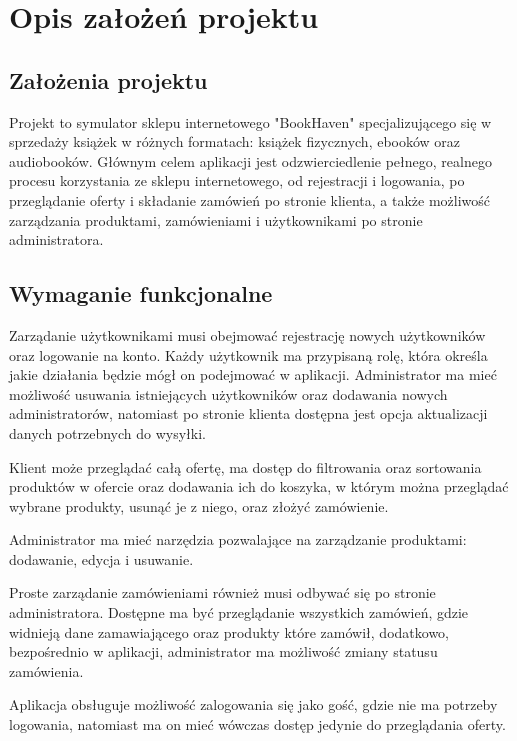 \chapter{Opis założeń projektu}
\label{cha:założenia}

\section{Założenia projektu}
\label{sec:zalozenia}

Projekt to symulator sklepu internetowego "BookHaven" specjalizującego się w sprzedaży książek w różnych formatach: książek fizycznych, ebooków oraz audiobooków.
Głównym celem aplikacji jest odzwierciedlenie pełnego, realnego procesu korzystania ze sklepu internetowego, od rejestracji i logowania, po przeglądanie
oferty i składanie zamówień po stronie klienta, a także możliwość zarządzania produktami, zamówieniami i użytkownikami po stronie administratora.



\section{Wymaganie funkcjonalne}
\label{sec:wymagania funkconajle}


Zarządanie użytkownikami musi obejmować rejestrację nowych użytkowników oraz logowanie na konto. 
Każdy użytkownik ma przypisaną rolę, która określa jakie działania będzie mógł on podejmować w aplikacji.
Administrator ma mieć możliwość usuwania istniejących użytkowników oraz dodawania nowych administratorów,
natomiast po stronie klienta dostępna jest opcja aktualizacji danych potrzebnych do wysyłki. 

Klient może przeglądać całą ofertę, ma dostęp do filtrowania oraz sortowania produktów w ofercie oraz dodawania ich do koszyka,
w którym można przeglądać wybrane produkty, usunąć je z niego, oraz złożyć zamówienie.

Administrator ma mieć narzędzia pozwalające na zarządzanie produktami: dodawanie, edycja i usuwanie.

Proste zarządanie zamówieniami również musi odbywać się po stronie administratora. Dostępne ma być przeglądanie wszystkich zamówień, gdzie widnieją
dane zamawiającego oraz produkty które zamówił, dodatkowo, bezpośrednio w aplikacji, administrator ma możliwość zmiany statusu zamówienia.

Aplikacja obsługuje możliwość zalogowania się jako gość, gdzie nie ma potrzeby logowania, natomiast ma on
mieć wówczas dostęp jedynie do przeglądania oferty.


